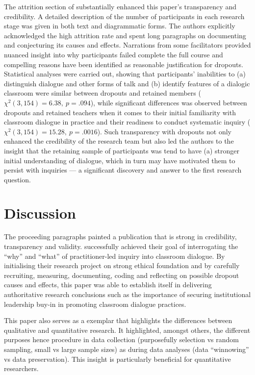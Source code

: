 \documentclass[
        a4paper, %
        12pt, %
        stu, %
        donotrepeattitle, %
        floatsintext, %
        biblatex, %
        twoside, %
        colorlinks=true,        %
        linkcolor=red,          %
        anchorcolor=red,      %
        citecolor=blue,         %
        urlcolor=blue,          %
        bookmarks=true,         %
        bookmarksopen=false,    %
        bookmarksnumbered=true,  %
        dvipsnames
]{apa7}
\begin{document}
The attrition section of \textcite[][pp. 17--20]{hennessy:2021} substantially enhanced this paper's transparency and credibility. A detailed description of the number of participants in each research stage was given in both text and diagrammatic forms. The authors explicitly acknowledged the high attrition rate and spent long paragraphs on documenting and conjecturing its causes and effects. Narrations from some facilitators provided nuanced insight into why participants failed complete the full course and compelling reasons have been identified as reasonable justification for dropouts. Statistical analyses were carried out, showing that participants' inabilities to (a) distinguish dialogue and other forms of talk and (b) identify features of a dialogic classroom were similar between dropouts and retained members ($\chi^2(3,154)=6.38,\ p=.094$), while significant differences was observed between dropouts and retained teachers when it comes to their initial familiarity with classroom dialogue in practice and their readiness to conduct systematic inquiry ($\chi^2(3,154)=15.28,\ p=.0016$). Such transparency with dropouts not only enhanced the credibility of the research team but also led the authors to the insight that the retaining sample of participants was tend to have (a) stronger initial understanding of dialogue, which in turn may have motivated them to persist with inquiries --- a significant discovery and answer to the first research question.

\section{Discussion} %

The proceeding paragraphs painted a publication that is strong in credibility, transparency and validity. \textcite{hennessy:2021} successfully achieved their goal of interrogating the ``why'' and ``what'' of practitioner-led inquiry into classroom dialogue. By initialising their research project on strong ethical foundation and by carefully recruiting, measuring, documenting, coding and reflecting on possible dropout causes and effects, this paper was able to establish itself in delivering authoritative research conclusions such as the importance of securing institutional leadership buy-in in promoting classroom dialogue practices.

This paper also serves as a exemplar that highlights the differences between qualitative and quantitative research. It highlighted, amongst others, the different purposes hence procedure in data collection (purposefully selection vs random sampling, small vs large sample sizes) as during data analyses (data ``winnowing'' vs data preservation). This insight is particularly beneficial for quantitative researchers.

\printbibliography
\end{document}
